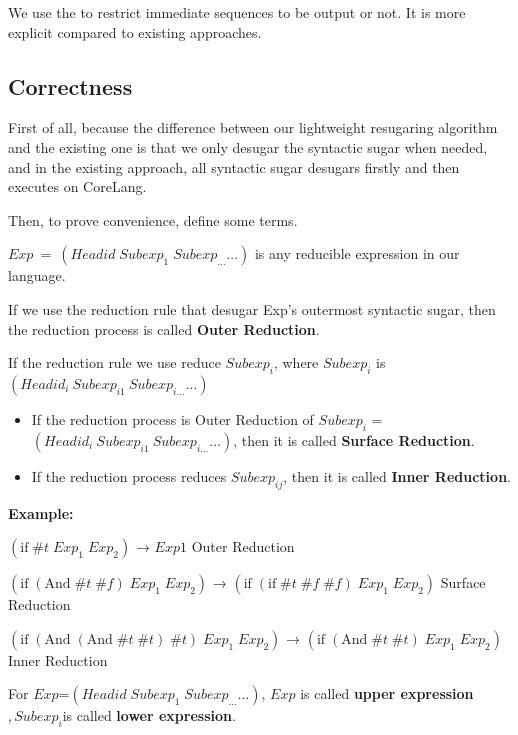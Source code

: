 We use the  to restrict immediate sequences to be output or not. It is more explicit compared to existing approaches.

\subsection{Correctness}

First of all, because the difference between our lightweight resugaring algorithm and the existing one is that we only desugar the syntactic sugar when needed, and in the existing approach, all syntactic sugar desugars firstly and then executes on CoreLang.

Then, to prove convenience, define some terms.

$Exp~=~(Headid\;Subexp_{1}\;Subexp_{\ldots} \ldots)$ is any reducible expression in our language.

If we use the reduction rule that desugar Exp's outermost syntactic sugar, then the reduction process is called {\bfseries Outer Reduction}.

If the reduction rule we use reduce $Subexp_{i}$, where $Subexp_{i}$ is $(Headid_{i}~Subexp_{i1}~Subexp_{i\ldots} \ldots)$
\begin{itemize}
	\item If the reduction process is Outer Reduction of $Subexp_{i}$ = $(Headid_{i}~Subexp_{i1}~Subexp_{i\ldots} \ldots)$, then it is called {\bfseries Surface Reduction}.
	\item If the reduction process reduces $Subexp_{ij}$, then it is called {\bfseries Inner Reduction}.
\end{itemize}

{\bfseries Example:}

$(\mbox{if}\; \#t\; Exp_{1}\; Exp_{2})$ → $Exp1$ \hfill Outer Reduction

$(\mbox{if}\; (\mbox{And}\; \#t\; \#f)\; Exp_{1}\; Exp_{2})$ → $(\mbox{if}\; (\mbox{if}\; \#t\; \#f\; \#f)\; Exp_{1}\; Exp_{2})$ \hfill Surface Reduction

$(\mbox{if}\; (\mbox{And}\; (\mbox{And}\; \#t\; \#t)\; \#t) \; Exp_{1}\; Exp_{2})$ → $(\mbox{if}\; (\mbox{And}\; \#t\; \#t)\; Exp_{1}\; Exp_{2})$ \hfill Inner Reduction

\begin{Def}
For $Exp$=$(Headid\;Subexp_{1}\;Subexp_{\ldots} \ldots)$, $Exp$ is called {\bfseries upper expression}$,Subexp_{i}$is called {\bfseries lower expression}.
\end{Def}

